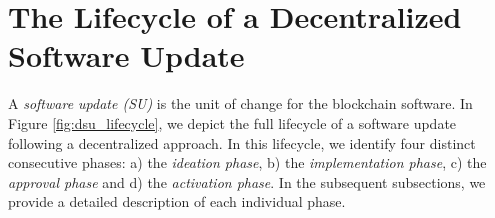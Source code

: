 \section{The Lifecycle of a Decentralized Software Update} \label{lifecycle}
A \emph{software update (SU)} is the unit of change for the blockchain 
software. In Figure \ref{fig:dsu_lifecycle}, we depict 
the full lifecycle of a software update following a decentralized approach. In this lifecycle, we identify four distinct consecutive phases: a) the \emph{ideation phase}, b) the \emph{implementation phase}, c) the \emph{approval phase} and d) the \emph{activation phase}. In the subsequent subsections, we provide a detailed description of each individual phase.


